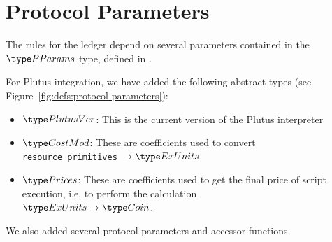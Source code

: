 \section{Protocol Parameters}
\label{sec:protocol-parameters}

The rules for the ledger depend on several parameters contained in the $\PParams$ type,
defined in \cite{byron_ledger_spec}.

For Plutus integration, we have added the following abstract types
(see Figure~\ref{fig:defs:protocol-parameters}):

\begin{itemize}
\item $\PlutusVer$: This is the current version of the Plutus interpreter
\item $\CostMod$: These are coefficients used to convert \\
\texttt{resource primitives}~$\to \ExUnits$
\item $\Prices$: These are coefficients used to get the final price of script
execution, i.e. to perform the calculation \\
$\ExUnits \to \Coin$.
\end{itemize}

We also added several protocol parameters and accessor functions.


